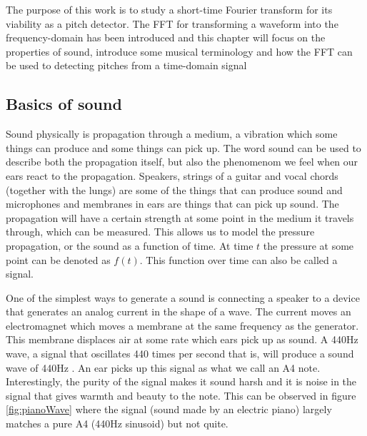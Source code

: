 The purpose of this work is to study a short-time Fourier transform for its viability as a pitch detector. The FFT for transforming a waveform into the frequency-domain has been introduced and this chapter will focus on the properties of sound, introduce some musical terminology and how the FFT can be used to detecting pitches from a time-domain signal

\subsection{Basics of sound}
Sound physically is propagation through a medium, a vibration which some things can produce and some things can pick up. The word sound can be used to describe both the propagation itself, but also the phenomenom we feel when our ears react to the propagation. Speakers, strings of a guitar and vocal chords (together with the lungs) are some of the things that can produce sound and microphones and membranes in ears are things that can pick up sound. The propagation will have a certain strength at some point in the medium it travels through, which can be measured. This allows us to model the pressure propagation, or the sound as a function of time. At time $t$ the pressure at some point can be denoted as $f(t)$. This function over time can also be called a signal.


One of the simplest ways to generate a sound is connecting a speaker to a device that generates an analog current in the shape of a wave. The current moves an electromagnet which moves a membrane at the same frequency as the generator. This membrane displaces air at some rate which ears pick up as sound. A 440Hz wave, a signal that oscillates 440 times per second that is, will produce a sound wave of 440Hz . An ear picks up this signal as what we call an A4 note. Interestingly, the purity of the signal makes it sound harsh and it is noise in the signal that gives warmth and beauty to the note. This can be observed in figure \ref{fig:pianoWave} where the signal (sound made by an electric piano) largely matches a pure A4 (440Hz sinusoid) but not quite.


